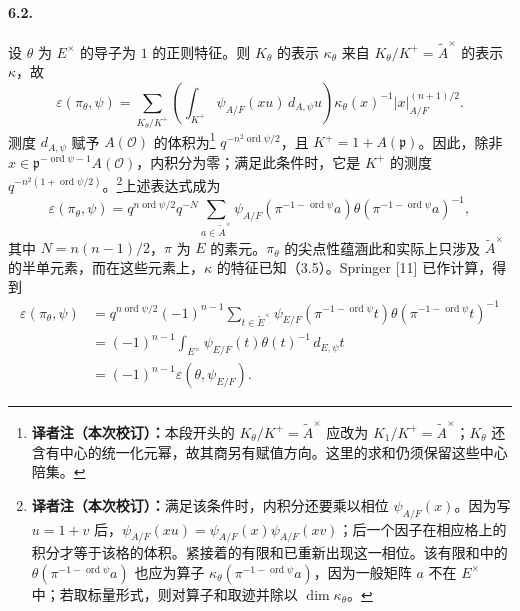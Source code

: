 \paragraph*{6.2.}设 $\theta$ 为 $E^\times$ 的导子为 $1$ 的正则特征。则 $K_\theta$ 的表示 $\kappa_\theta$ 来自 $K_\theta/K^+=\widetilde A^\times$ 的表示 $\kappa$，故
\[
\varepsilon(\pi_\theta,\psi)=\sum_{K_\theta/K^+}\left(\int_{K^+}\psi_{A/F}(xu)\,d_{A,\psi}u\right)\kappa_\theta(x)^{-1}|x|_{A/F}^{(n+1)/2}.
\]
测度 $d_{A,\psi}$ 赋予 $A(\mathcal O)$ 的体积为\footnote{\textbf{译者注（本次校订）：}本段开头的 $K_\theta/K^+=\widetilde A^\times$ 应改为 $K_1/K^+=\widetilde A^\times$；$K_\theta$ 还含有中心的统一化元幂，故其商另有赋值方向。这里的求和仍须保留这些中心陪集。} $q^{-n^2\operatorname{ord}\psi/2}$，且 $K^+=1+A(\mathfrak p)$。因此，除非 $x\in\mathfrak p^{-\operatorname{ord}\psi-1}A(\mathcal O)$，内积分为零；满足此条件时，它是 $K^+$ 的测度 $q^{-n^2(1+\operatorname{ord}\psi/2)}$。\footnote{\textbf{译者注（本次校订）：}满足该条件时，内积分还要乘以相位 $\psi_{A/F}(x)$。因为写 $u=1+v$ 后，$\psi_{A/F}(xu)=\psi_{A/F}(x)\psi_{A/F}(xv)$；后一个因子在相应格上的积分才等于该格的体积。紧接着的有限和已重新出现这一相位。该有限和中的 $\theta(\pi^{-1-\operatorname{ord}\psi}a)$ 也应为算子 $\kappa_\theta(\pi^{-1-\operatorname{ord}\psi}a)$，因为一般矩阵 $a$ 不在 $E^\times$ 中；若取标量形式，则对算子和取迹并除以 $\dim\kappa_\theta$。}上述表达式成为
\[
\varepsilon(\pi_\theta,\psi)=q^{n\operatorname{ord}\psi/2}q^{-N}
\sum_{a\in\widetilde A^\times}\psi_{A/F}(\pi^{-1-\operatorname{ord}\psi}a)\theta(\pi^{-1-\operatorname{ord}\psi}a)^{-1},
\]
其中 $N=n(n-1)/2$，$\pi$ 为 $E$ 的素元。$\pi_\theta$ 的尖点性蕴涵此和实际上只涉及 $\widetilde A^\times$ 的半单元素，而在这些元素上，$\kappa$ 的特征已知（3.5）。Springer [11] 已作计算，得到
\[
\begin{aligned}
\varepsilon(\pi_\theta,\psi)
&=q^{n\operatorname{ord}\psi/2}(-1)^{n-1}\sum_{t\in\widetilde E^\times}
\psi_{E/F}(\pi^{-1-\operatorname{ord}\psi}t)\theta(\pi^{-1-\operatorname{ord}\psi}t)^{-1}\\
&=(-1)^{n-1}\int_{E^\times}\psi_{E/F}(t)\theta(t)^{-1}\,d_{E,\psi}t\\
&=(-1)^{n-1}\varepsilon(\theta,\psi_{E/F}).
\end{aligned}
\]
